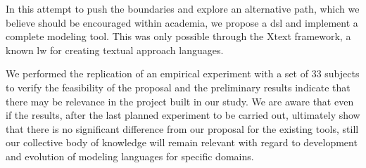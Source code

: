 In this attempt to push the boundaries and explore an alternative path, which we believe should be encouraged within academia, we propose a \ac{dsl} and implement a complete modeling tool.
This was only possible through the Xtext framework, a known \ac{lw} for creating textual approach languages.

We performed the replication of an empirical experiment with a set of 33 subjects to verify the feasibility of the proposal and the preliminary results indicate that there may be relevance in the project built in our study.
We are aware that even if the results, after the last planned experiment to be carried out, ultimately show that there is no significant difference from our proposal for the existing tools, still our collective body of knowledge will remain relevant with regard to development and evolution of modeling languages for specific domains.

